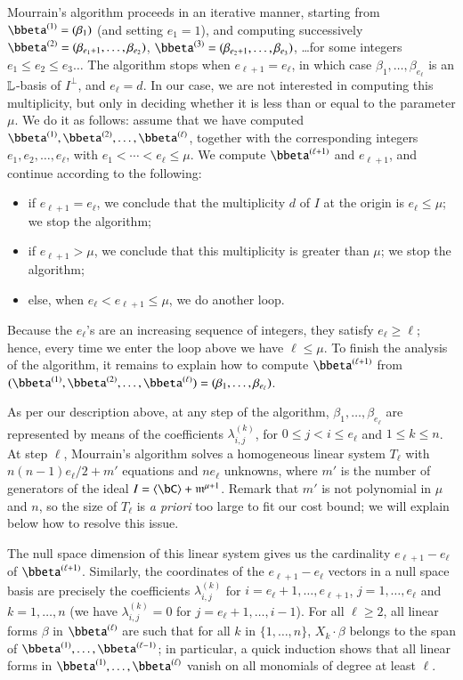 \documentclass[amsthm]{elsart}
\begin{document}
Mourrain's algorithm proceeds in an iterative manner, starting from
$\bbeta^{(1)}=(\beta_{1})$ (and setting $e_1=1$), and computing
successively $\bbeta^{(2)}=(\beta_{e_1+1},\dots,\beta_{e_2})$,
$\bbeta^{(3)}=(\beta_{e_2+1},\dots,\beta_{e_3})$, \dots for some
integers $e_1 \le e_2 \le e_3 \dots$ The algorithm stops when
$e_{\ell+1}=e_{\ell}$, in which case $\beta_1,\dots,\beta_{e_\ell}$ is
an $\mathbb{L}$-basis of $I^\perp$, and $e_\ell=d$. In our case, we
are not interested in computing this multiplicity, but only in
deciding whether it is less than or equal to the parameter $\mu$. We do it as follows: assume that we have
computed $\bbeta^{(1)},\bbeta^{(2)},\dots,\bbeta^{(\ell)}$, together
with the corresponding integers $e_1,e_2,\dots,e_\ell$, with $e_1 <
\cdots < e_\ell \le \mu$. We compute $\bbeta^{(\ell+1)}$ and $e_{\ell+1}$,
and continue according to the following:
\begin{itemize}
\item if $e_{\ell+1}=e_{\ell}$, we conclude that the multiplicity
  $d$ of $I$ at the origin is $e_\ell \le \mu$; we stop the
  algorithm;
\item if $e_{\ell+1} > \mu$, we conclude that this multiplicity is greater 
  than $\mu$; we stop the algorithm;
\item else, when $e_\ell < e_{\ell+1} \le \mu$, we do another loop.
\end{itemize}
Because the $e_\ell$'s are an increasing sequence of integers, they
satisfy $e_\ell \ge \ell$; hence, every time we enter the loop above we
have $\ell \le \mu$. To finish the analysis of the algorithm, it
remains to explain how to compute $\bbeta^{(\ell+1)}$ from
$(\bbeta^{(1)},\bbeta^{(2)},\dots,\bbeta^{(\ell)})=(\beta_{1},\dots,\beta_{e_\ell})$.

As per our description above, at any step of the algorithm,
$\beta_{1},\dots,\beta_{e_\ell}$ are represented by means of the
coefficients $\lambda^{(k)}_{i,j}$, for $0 \le j < i \le e_{\ell}$ and
$1 \le k \le n$.  At step $\ell$, Mourrain's algorithm solves a homogeneous linear system
$T_\ell$ with $n(n-1) e_\ell/2+m'$ equations and $n e_\ell$ unknowns,
where $m'$ is the number of generators of the ideal $I= \langle \bC
\rangle + \m^{\mu+1}$. Remark that $m'$ is not polynomial in $\mu$ 
and $n$, so the size of $T_\ell$ is {\em a priori} too large to 
fit our cost bound; we will explain below how to resolve this issue.

The null space dimension of this linear system gives us the cardinality
$e_{\ell+1}-e_{\ell}$ of $\bbeta^{(\ell+1)}$. Similarly, the coordinates of
the $e_{\ell+1}-e_{\ell}$ vectors in a null space basis are precisely
the coefficients $\lambda^{(k)}_{i,j}$ for
$i=e_{\ell}+1,\dots,e_{\ell+1}$, $j=1,\dots,e_\ell$ and $k=1,\dots,n$
(we have $\lambda^{(k)}_{i,j}=0$ for $j=e_{\ell}+1,\dots,i-1$). For
all $\ell \ge 2$, all linear forms $\beta$ in $\bbeta^{(\ell)}$ are
such that for all $k$ in $\{1,\dots,n\}$, $X_k \cdot \beta$ belongs to
the span of $\bbeta^{(1)},\dots,\bbeta^{(\ell-1)}$; in particular, a
quick induction shows that all linear forms in
$\bbeta^{(1)},\dots,\bbeta^{(\ell)}$ vanish on all monomials of degree
at least $\ell$.
\end{document}
